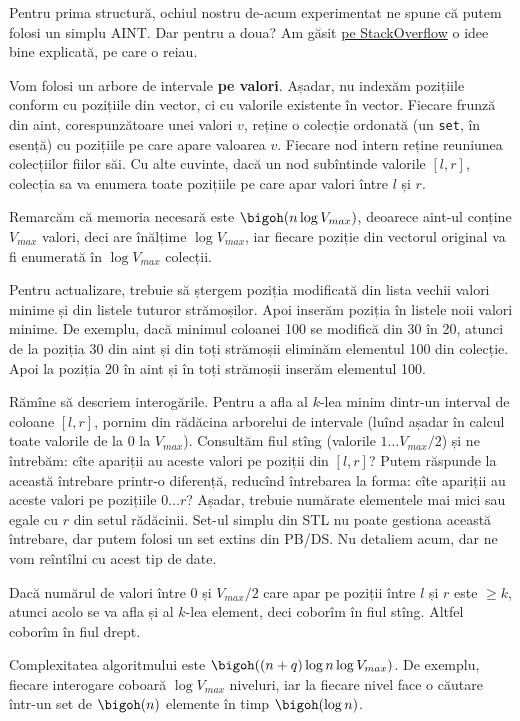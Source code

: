 Pentru prima structură, ochiul nostru de-acum experimentat ne spune că putem folosi un simplu AINT. Dar pentru a doua? Am găsit \href{https://stackoverflow.com/a/22075025/6022817}{pe StackOverflow} o idee bine explicată, pe care o reiau.

Vom folosi un arbore de intervale \textbf{pe valori}. Așadar, nu indexăm pozițiile conform cu pozițiile din vector, ci cu valorile existente în vector. Fiecare frunză din aint, corespunzătoare unei valori $v$, reține o colecție ordonată (un \texttt{set}, în esență) cu pozițiile pe care apare valoarea $v$. Fiecare nod intern reține reuniunea colecțiilor fiilor săi. Cu alte cuvinte, dacă un nod subîntinde valorile $[l, r]$, colecția sa va enumera toate pozițiile pe care apar valori între $l$ și $r$.

Remarcăm că memoria necesară este $\bigoh(n \log V_{max})$, deoarece aint-ul conține $V_{max}$ valori, deci are înălțime $\log V_{max}$, iar fiecare poziție din vectorul original va fi enumerată în $\log V_{max}$ colecții.

Pentru actualizare, trebuie să ștergem poziția modificată din lista vechii valori minime și din listele tuturor strămoșilor. Apoi inserăm poziția în listele noii valori minime. De exemplu, dacă minimul coloanei 100 se modifică din 30 în 20, atunci de la poziția 30 din aint și din toți strămoșii eliminăm elementul 100 din colecție. Apoi la poziția 20 în aint și în toți strămoșii inserăm elementul 100.

Rămîne să descriem interogările. Pentru a afla al $k$-lea minim dintr-un interval de coloane $[l, r]$, pornim din rădăcina arborelui de intervale (luînd așadar în calcul toate valorile de la 0 la $V_{max}$). Consultăm fiul stîng (valorile $1 \dots V_{max}/2$) și ne întrebăm: cîte apariții au aceste valori pe poziții din $[l, r]$? Putem răspunde la această întrebare printr-o diferență, reducînd întrebarea la forma: cîte apariții au aceste valori pe pozițiile $0 \dots r$? Așadar, trebuie numărate elementele mai mici sau egale cu $r$ din setul rădăcinii. Set-ul simplu din STL nu poate gestiona această întrebare, dar putem folosi un set extins din PB/DS. Nu detaliem acum, dar ne vom reîntîlni cu acest tip de date.

Dacă numărul de valori între 0 și $V_{max}/2$ care apar pe poziții între $l$ și $r$ este $\geq k$, atunci acolo se va afla și al $k$-lea element, deci coborîm în fiul stîng. Altfel coborîm în fiul drept.

Complexitatea algoritmului este $\bigoh((n + q) \log n \log V_{max})$. De exemplu, fiecare interogare coboară $\log V_{max}$ niveluri, iar la fiecare nivel face o căutare într-un set de $\bigoh(n)$ elemente în timp $\bigoh(\log n)$.
